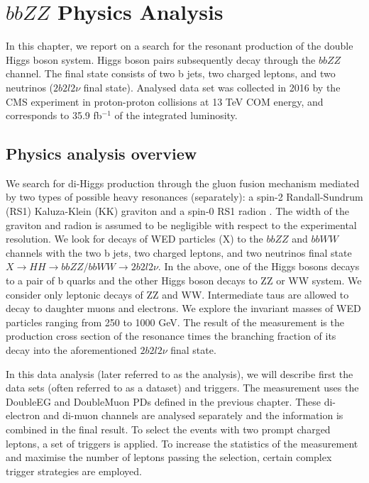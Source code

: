 \chapter{$bbZZ$ Physics Analysis}

In this chapter, we report on a search for the resonant production of the double Higgs boson system. Higgs boson pairs subsequently decay through the $bbZZ$ channel. The final state consists of two b jets, two charged leptons, and two neutrinos ($2 b 2 l 2 \nu$ final state). Analysed data set was collected in 2016 by the CMS experiment in proton-proton collisions  at  13  TeV COM energy, and corresponds to 35.9 fb$^{-1}$ of the integrated luminosity.  

\section{Physics analysis overview}
\label{sec:an_overview}

We search for di-Higgs production through  the  gluon fusion mechanism mediated by two types of possible heavy resonances (separately): a spin-2 Randall-Sundrum (RS1) Kaluza-Klein (KK) graviton and a spin-0 RS1 radion \cite{WED, Xanda}. The width of the graviton and radion is assumed to be negligible with respect to the experimental resolution. We look for decays of WED particles (X) to the $bbZZ$ and $bbWW$ channels with the two b jets, two charged leptons, and two neutrinos final state $X \rightarrow HH \rightarrow bbZZ/bbWW \rightarrow 2 b 2l 2 \nu$. In the above, one of the Higgs bosons decays to a pair of b quarks and the other Higgs boson decays to ZZ or WW system. We consider only leptonic decays of ZZ and WW. Intermediate taus are allowed to decay to daughter muons and electrons.  We explore the invariant masses of WED particles ranging from 250 to 1000  GeV. The result of the measurement is the production cross section of the resonance times the branching fraction of its decay into the aforementioned $2 b 2 l 2 \nu$ final state. 

In this data analysis (later referred to as the analysis), we will describe first the data sets (often referred to as a dataset) and triggers. The measurement uses the DoubleEG and DoubleMuon PDs defined in the previous chapter. These di-electron and di-muon channels are analysed separately and the information is combined in the final result. To select the events with two prompt charged leptons, a set of triggers is applied. To increase the statistics of the measurement and maximise the number of leptons passing the selection, certain complex trigger strategies are employed. 

